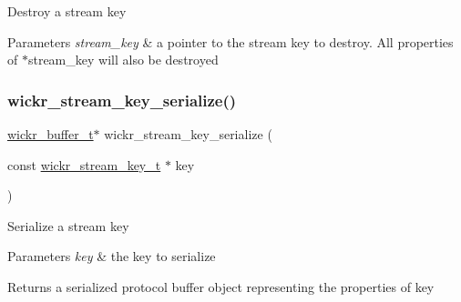 Destroy a stream key


\begin{DoxyParams}{Parameters}
{\em stream\+\_\+key} & a pointer to the stream key to destroy. All properties of \textquotesingle{}$\ast$stream\+\_\+key\textquotesingle{} will also be destroyed \\
\hline
\end{DoxyParams}
\mbox{\label{group__wickr__stream_gae1540c98a88e2f62e96fb2ee209e2290}} 
\subsubsection{\texorpdfstring{wickr\+\_\+stream\+\_\+key\+\_\+serialize()}{wickr\_stream\_key\_serialize()}}
{\footnotesize\ttfamily \hyperlink{structwickr__buffer}{wickr\+\_\+buffer\+\_\+t}$\ast$ wickr\+\_\+stream\+\_\+key\+\_\+serialize (\begin{DoxyParamCaption}\item[{const \hyperlink{structwickr__stream__key}{wickr\+\_\+stream\+\_\+key\+\_\+t} $\ast$}]{key }\end{DoxyParamCaption})}

Serialize a stream key


\begin{DoxyParams}{Parameters}
{\em key} & the key to serialize \\
\hline
\end{DoxyParams}
\begin{DoxyReturn}{Returns}
a serialized protocol buffer object representing the properties of \textquotesingle{}key\textquotesingle{} 
\end{DoxyReturn}
